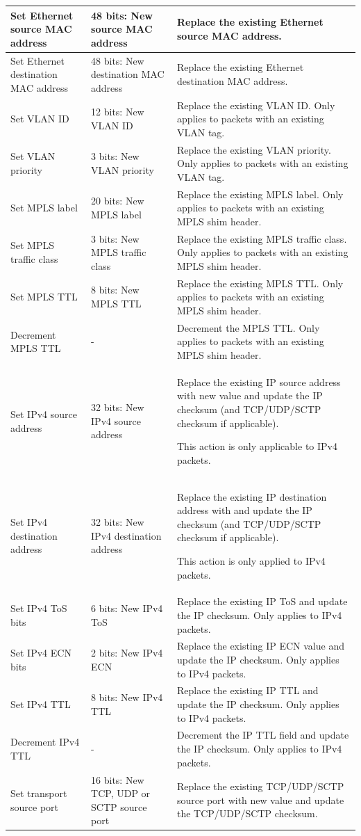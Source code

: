 \documentclass[10pt]{article}
\begin{document}
\begin{xtabular}{ |p{\atactionwidth}|p{\atassocwidth}|p{\atdescwidth}| }
Set Ethernet source MAC address &
48 bits: New source MAC address &
Replace the existing Ethernet source MAC address. \\
\hline
Set Ethernet destination MAC address &
48 bits: New destination MAC address &
Replace the existing Ethernet destination MAC address. \\
\hline
Set VLAN ID &
12 bits: New VLAN ID &
Replace the existing VLAN ID.
Only applies to packets with an existing VLAN tag. \\
\hline
Set VLAN priority &
3 bits: New VLAN priority &
Replace the existing VLAN priority.
Only applies to packets with an existing VLAN tag. \\
\hline
Set MPLS label &
20 bits: New MPLS label &
Replace the existing MPLS label.
Only applies to packets with an existing MPLS shim header. \\
\hline
Set MPLS traffic class &
3 bits: New MPLS traffic class &
Replace the existing MPLS traffic class.
Only applies to packets with an existing MPLS shim header. \\
\hline
Set MPLS TTL &
8 bits: New MPLS TTL &
Replace the existing MPLS TTL.
Only applies to packets with an existing MPLS shim header. \\
\hline
Decrement MPLS TTL &
- &
Decrement the MPLS TTL.
Only applies to packets with an existing MPLS shim header. \\
\hline
Set IPv4 source address &
32 bits: New IPv4 source address &
Replace the existing IP source address with new value and update the IP checksum (and TCP/UDP/SCTP 
checksum if applicable). 

This action is only applicable to IPv4 packets. \\
\hline
Set IPv4 destination address &
32 bits: New IPv4 destination address &
Replace the existing IP destination address with and update the IP checksum (and TCP/UDP/SCTP checksum if applicable).

This action is only applied to IPv4 packets. \\
\hline
Set IPv4 ToS bits &
6 bits: New IPv4 ToS &
Replace the existing IP ToS and update the IP checksum.
Only applies to IPv4 packets. \\
\hline
Set IPv4 ECN bits &
2 bits: New IPv4 ECN &
Replace the existing IP ECN value and update the IP checksum.
Only applies to IPv4 packets. \\
\hline
Set IPv4 TTL &
8 bits: New IPv4 TTL &
Replace the existing IP TTL and update the IP checksum.
Only applies to IPv4 packets. \\
\hline
Decrement IPv4 TTL &
- &
Decrement the IP TTL field and update the IP checksum.
Only applies to IPv4 packets. \\
\hline
Set transport source port &
16 bits: New TCP, UDP or SCTP source port &
Replace the existing TCP/UDP/SCTP source port with new value and update the TCP/UDP/SCTP checksum.


\end{xtabular}
\end{document}
